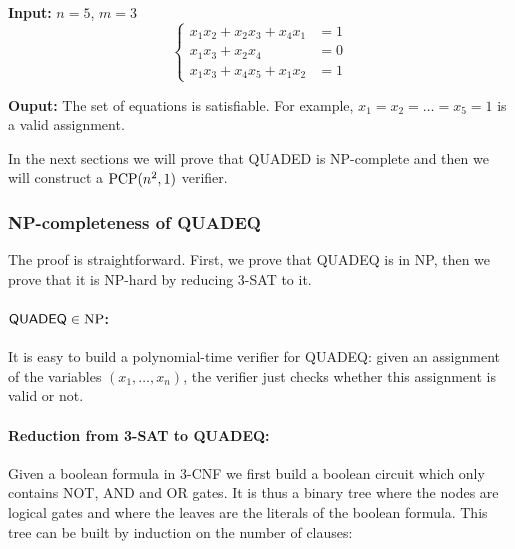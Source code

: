 \begin{example}
\textbf{Input:} $n=5$, $m=3$
\begin{displaymath}
\left\{\begin{array}{rl}
x_1x_2 + x_2x_3 + x_4x_1 & = 1\\
x_1x_3 + x_2x_4 & = 0\\
x_1x_3 + x_4x_5 + x_1x_2 & = 1        
\end{array}\right.
\end{displaymath}

\textbf{Ouput:} The set of equations is satisfiable. For example, $x_1 = x_2 =
  \ldots = x_5 = 1$ is a valid assignment.
\end{example}

In the next sections we will prove that \textsf{QUADED} is NP-complete and then
we will construct a $\mathrm{PCP}(n^2,1)$ verifier.

\subsubsection{NP-completeness of \textsf{QUADEQ}}

The proof is straightforward. First, we prove that \textsf{QUADEQ} is in
NP, then we prove that it is NP-hard by reducing \textsf{3-SAT} to it.

\paragraph{$\textsf{QUADEQ}\in\mathrm{NP}$:} It is easy to build a polynomial-time
verifier for \textsf{QUADEQ}: given an assignment of the variables
$(x_1,\ldots,x_n)$, the verifier just checks whether this assignment is valid
or not.

\paragraph{Reduction from \textsf{3-SAT} to \textsf{QUADEQ}:} Given a boolean
formula in 3-CNF we first build a boolean circuit which only contains
\textsf{NOT}, \textsf{AND} and \textsf{OR} gates. It is thus a binary tree where
the nodes are logical gates and where the leaves are the literals of the
boolean formula. This tree can be built by induction on the number of clauses:

